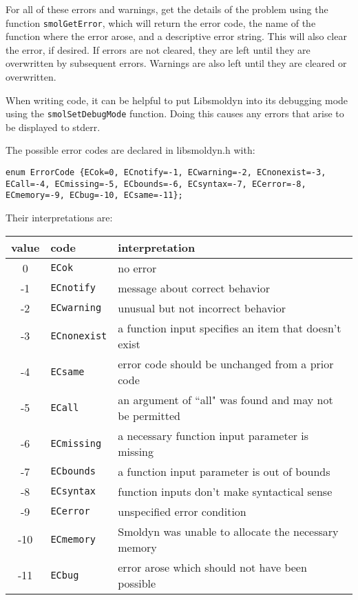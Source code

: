 \documentclass {book}
\begin{document}
For all of these errors and warnings, get the details of the problem using the function \texttt{smolGetError}, which will return the error code, the name of the function where the error arose, and a descriptive error string. This will also clear the error, if desired. If errors are not cleared, they are left until they are overwritten by subsequent errors. Warnings are also left until they are cleared or overwritten.

When writing code, it can be helpful to put Libsmoldyn into its debugging mode using the \texttt{smolSetDebugMode} function. Doing this causes any errors that arise to be displayed to stderr.

The possible error codes are declared in libsmoldyn.h with:

\begin{lstlisting}
enum ErrorCode {ECok=0, ECnotify=-1, ECwarning=-2, ECnonexist=-3, ECall=-4, ECmissing=-5, ECbounds=-6, ECsyntax=-7, ECerror=-8, ECmemory=-9, ECbug=-10, ECsame=-11};
\end{lstlisting}

Their interpretations are:

\begin{longtable}[c]{cll}
value & code & interpretation\\
\hline
0 & \texttt{ECok} & no error\\
-1 & \texttt{ECnotify} & message about correct behavior\\
-2 & \texttt{ECwarning} & unusual but not incorrect behavior\\
-3 & \texttt{ECnonexist} & a function input specifies an item that doesn't exist\\
-4 & \texttt{ECsame} & error code should be unchanged from a prior code\\
-5 & \texttt{ECall} & an argument of ``all" was found and may not be permitted\\
-6 & \texttt{ECmissing} & a necessary function input parameter is missing\\
-7 & \texttt{ECbounds} & a function input parameter is out of bounds\\
-8 & \texttt{ECsyntax} & function inputs don't make syntactical sense\\
-9 & \texttt{ECerror} & unspecified error condition\\
-10 & \texttt{ECmemory} & Smoldyn was unable to allocate the necessary memory\\
-11 & \texttt{ECbug} & error arose which should not have been possible\\

\end{longtable}
\end{document}
